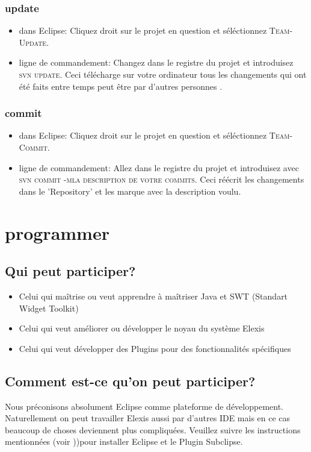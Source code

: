 \subsection{update}
\begin{itemize}
  \item dans Eclipse: Cliquez droit sur le projet en question et séléctionnez \textsc{Team-Update}.
  \item ligne de commandement: Changez dans le registre du projet et introduisez \textsc{svn update}. Ceci télécharge sur votre ordinateur tous les changements qui ont été faits entre temps peut être par d'autres personnes .
\end{itemize}
\subsection{commit}
\begin{itemize}
  \item dans Eclipse: Cliquez droit sur le projet en question et séléctionnez \textsc{Team-Commit}.
  \item ligne de commandement: Allez dans le registre du projet et introduisez avec \textsc{svn commit
  -m\glqq la description de votre commits\grqq}. Ceci réécrit les changements dans le 'Repository' et les marque avec la description voulu.
\end{itemize}


\chapter{programmer}
\section{Qui peut participer?}
\begin{itemize}
  \item Celui qui maîtrise ou veut apprendre à maîtriser Java et SWT (Standart Widget Toolkit) 
  \item Celui qui veut améliorer ou développer le noyau du système Elexis
  \item Celui qui veut développer des Plugins pour des fonctionnalités spécifiques
\end{itemize}
\section{Comment est-ce qu'on peut participer?}
Nous préconisons absolument Eclipse comme plateforme de développement. Naturellement on peut travailler Elexis aussi par d'autres IDE mais en ce cas beaucoup de choses deviennent plus compliquées.
Veuillez suivre les instructions mentionnées (voir \pageref{Eclipse}))pour installer Eclipse et le Plugin Subclipse.

